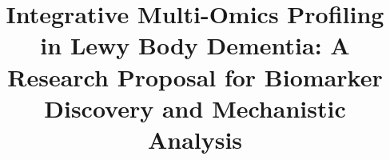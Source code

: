 \documentclass[conference]{IEEEtran}
\begin{document}
\title{Integrative Multi-Omics Profiling in Lewy Body Dementia: A Research Proposal for Biomarker Discovery and Mechanistic Analysis}

\author{}

\maketitle









\printbibliography
\end{document}

